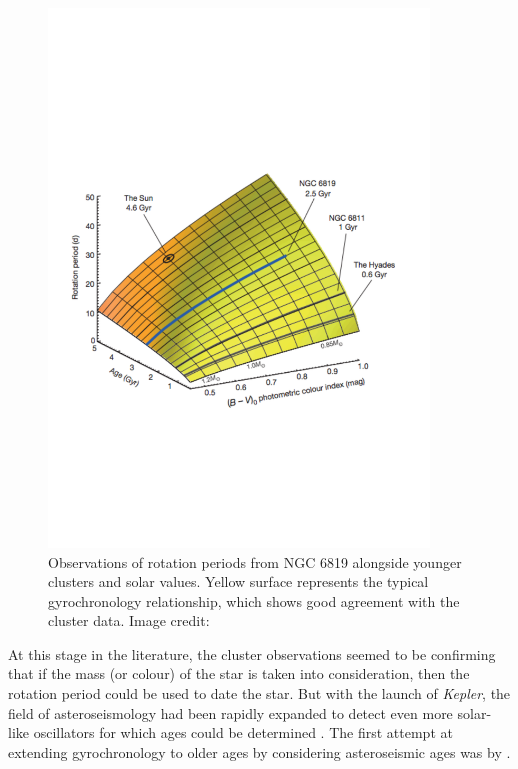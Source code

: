 \begin{figure}[t]
    \centering
    \includegraphics[width=0.9\textwidth]{Figures/2-Historical_overview/meibom_etal_2015.pdf}
    \caption[Comparison of data from 2.5 Gyr old cluster to previous gyrochronology relationship]{Observations of rotation periods from NGC 6819 alongside younger clusters and solar values. Yellow surface represents the typical gyrochronology relationship, which shows good agreement with the cluster data. Image credit: \citet{Meibom_etal_2015}}
    \label{fig:Meibom_etal_2015_plot}
\end{figure}

At this stage in the literature, the cluster observations seemed to be confirming that if the mass (or colour) of the star is taken into consideration, then the rotation period could be used to date the star. But with the launch of \textit{Kepler}, the field of asteroseismology had been rapidly expanded to detect even more solar-like oscillators for which ages could be determined \citep{Chaplin_etal_2011}. The first attempt at extending gyrochronology to older ages by considering asteroseismic ages was by \citet{Angus_etal_2015}.

